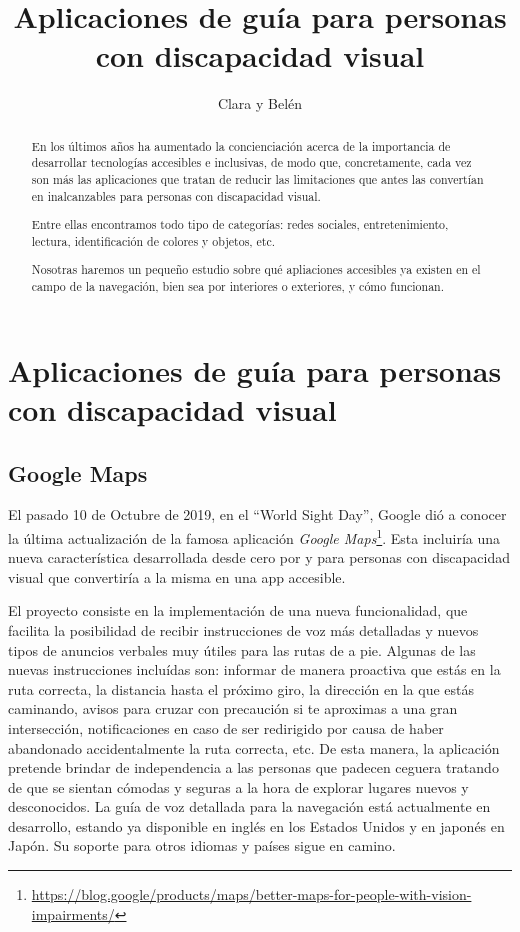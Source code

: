 \documentclass{article}
\title{\Huge Aplicaciones de guía para personas con discapacidad visual}
\author{Clara y Belén}
\begin{document}
	
	
	\begin{titlepage}
		\maketitle
		\thispagestyle{empty}
	\end{titlepage}
	
	\begin{abstract}
	    En los últimos años ha aumentado la concienciación acerca de la importancia de desarrollar tecnologías accesibles e inclusivas, de modo que, concretamente, cada vez son más las aplicaciones que tratan de reducir las limitaciones que antes las convertían en inalcanzables para personas con discapacidad visual.
	    
	    Entre ellas encontramos todo tipo de categorías: redes sociales, entretenimiento, lectura, identificación de colores y objetos, etc. 
	    
	    Nosotras haremos un pequeño estudio sobre qué apliaciones accesibles ya existen en el campo de la navegación, bien sea por interiores o exteriores, y cómo funcionan.
	
	\end{abstract}
	
	
	\section{Aplicaciones de guía para personas con discapacidad visual}
	
	\subsection{Google Maps}
		El pasado 10 de Octubre de 2019, en el ``World Sight Day'', Google dió a conocer la última actualización de la famosa aplicación \textit{Google Maps}\footnote{\url{https://blog.google/products/maps/better-maps-for-people-with-vision-impairments/}}. Esta incluiría una nueva característica desarrollada desde cero por y para personas con discapacidad visual que convertiría a la misma en una app accesible.
		
		El proyecto consiste en la implementación de una nueva funcionalidad, que facilita la posibilidad de recibir instrucciones de voz más detalladas y nuevos tipos de anuncios verbales muy útiles para las rutas de a pie. Algunas de las nuevas instrucciones incluídas son: informar de manera proactiva que estás en la ruta correcta, la distancia hasta el próximo giro, la dirección en la que estás caminando, avisos para cruzar con precaución si te aproximas a una gran intersección, notificaciones en caso de ser redirigido por causa de haber abandonado accidentalmente la ruta correcta, etc. De esta manera, la aplicación pretende brindar de independencia a las personas que padecen ceguera tratando de que se sientan cómodas y seguras a la hora de explorar lugares nuevos y desconocidos. La guía de voz detallada para la navegación está actualmente en desarrollo, estando ya disponible en inglés en los Estados Unidos y en japonés en Japón. Su soporte para otros idiomas y países sigue en camino.
		
\end{document}
